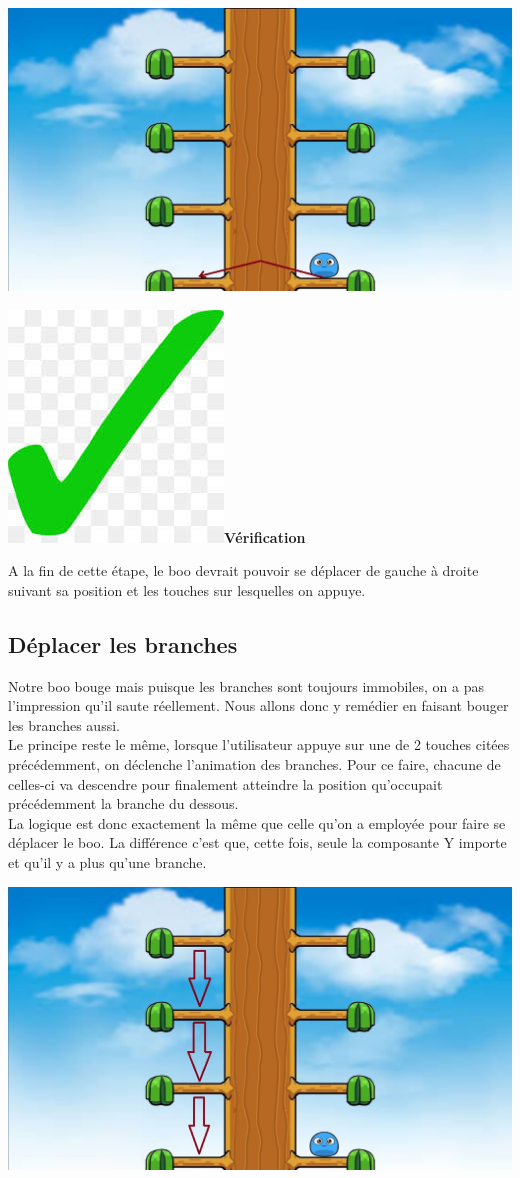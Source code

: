 \documentclass[french]{article}
\newcommand{\result}{\includegraphics[scale=0.1]{green_tick}\textbf{Vérification\\}}
\begin{document}
\begin{center}
	\includegraphics[scale=0.20]{step3-3}
\end{center}

\result

A la fin de cette étape, le boo devrait pouvoir se déplacer de gauche à droite suivant sa position et les touches sur lesquelles on appuye.

\subsection{Déplacer les branches}

Notre boo bouge mais puisque les branches sont toujours immobiles, on a pas l'impression qu'il saute réellement. Nous allons donc y remédier en faisant bouger les branches aussi.\\

Le principe reste le même, lorsque l'utilisateur appuye sur une de 2 touches citées précédemment, on déclenche l'animation des branches. Pour ce faire, chacune de celles-ci va descendre pour finalement atteindre la position qu'occupait précédemment la branche du dessous.\\

La logique est donc exactement la même que celle qu'on a employée pour faire se déplacer le boo. La différence c'est que, cette fois, seule la composante Y importe et qu'il y a plus qu'une branche.

\begin{center}
	\includegraphics[scale=0.20]{step4-1}
\end{center}
\end{document}
